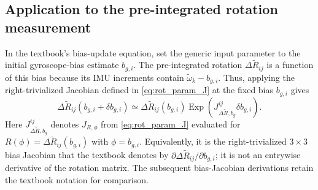 \documentclass[11pt,a4paper]{article}
\newcommand{\Exp}{\operatorname{Exp}}
\begin{document}
\subsection{Application to the pre-integrated rotation measurement}
In the textbook's bias-update equation, set the generic input parameter
to the initial gyroscope-bias estimate $b_{g,i}$. The pre-integrated
rotation $\Delta\tilde R_{ij}$ is a function of this bias because
its IMU increments contain $\tilde\omega_k-b_{g,i}$.
Thus, applying the right-trivialized Jacobian defined in
\eqref{eq:rot_param_J} at the fixed bias $b_{g,i}$ gives
\begin{equation}\label{eq:preint_bg_rotation}
\boxed{\Delta\tilde R_{ij}(b_{g,i}+\delta b_{g,i})\simeq
\Delta\tilde R_{ij}(b_{g,i})
\Exp\!\left(J_{\Delta\tilde R,b_g}^{ij}\delta b_{g,i}\right).}
\end{equation}
Here $J_{\Delta\tilde R,b_g}^{ij}$ denotes $J_{R,\phi}$ from
\eqref{eq:rot_param_J} evaluated for
$R(\phi)=\Delta\tilde R_{ij}(b_{g,i})$ with $\phi=b_{g,i}$.
Equivalently, it is the right-trivialized $3\times3$ bias Jacobian
that the textbook denotes by
$\partial\Delta\tilde R_{ij}/\partial b_{g,i}$; it is not an
entrywise derivative of the rotation matrix. The subsequent
bias-Jacobian derivations retain the textbook notation for comparison.
\end{document}
